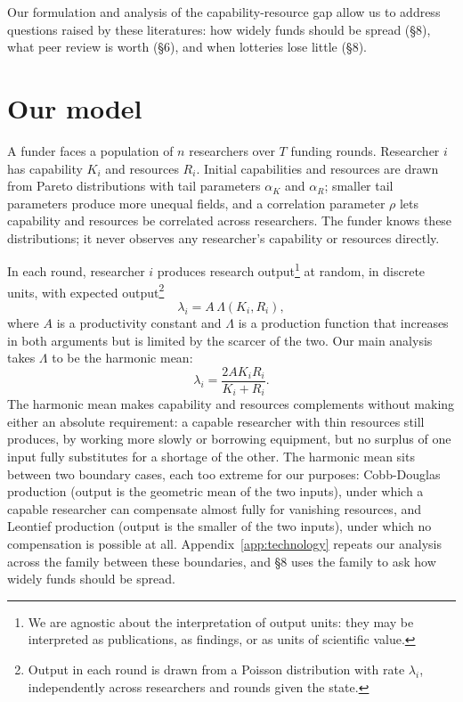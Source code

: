 \documentclass[article, 11pt, reqno]{amsart}
\theoremstyle{named}
\begin{document}
Our formulation and analysis of the capability-resource gap allow us to address questions raised by these literatures: how widely funds should be spread (\S8), what peer review is worth (\S6), and when lotteries lose little (\S8).

\section{Our model}\label{sec:model}

A funder faces a population of $n$ researchers over $T$ funding rounds. Researcher $i$ has capability $K_i$ and resources $R_i$. Initial capabilities and resources are drawn from Pareto distributions with tail parameters $\alpha_K$ and $\alpha_R$; smaller tail parameters produce more unequal fields, and a correlation parameter $\rho$ lets capability and resources be correlated across researchers. The funder knows these distributions; it never observes any researcher's capability or resources directly.

In each round, researcher $i$ produces research output\footnote{We are agnostic about the interpretation of output units: they may be interpreted as publications, as findings, or as units of scientific value.} at random, in discrete units, with expected output\footnote{Output in each round is drawn from a Poisson distribution with rate $\lambda_i$, independently across researchers and rounds given the state.}
\[
\lambda_i = A\,\Lambda(K_i, R_i),
\]
where $A$ is a productivity constant and $\Lambda$ is a production function that increases in both arguments but is limited by the scarcer of the two. Our main analysis takes $\Lambda$ to be the harmonic mean:
\[
\lambda_i = \frac{2A K_i R_i}{K_i + R_i}.
\]
The harmonic mean makes capability and resources complements without making either an absolute requirement: a capable researcher with thin resources still produces, by working more slowly or borrowing equipment, but no surplus of one input fully substitutes for a shortage of the other. The harmonic mean sits between two boundary cases, each too extreme for our purposes: Cobb-Douglas production (output is the geometric mean of the two inputs), under which a capable researcher can compensate almost fully for vanishing resources, and Leontief production (output is the smaller of the two inputs), under which no compensation is possible at all. Appendix~\ref{app:technology} repeats our analysis across the family between these boundaries, and \S8 uses the family to ask how widely funds should be spread.
\end{document}
